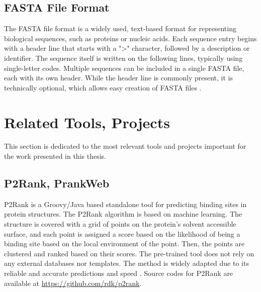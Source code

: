 \subsection{FASTA File Format}
\label{sec:fasta-format}

The FASTA file format is a widely used, text-based format for representing biological sequences, such as proteins or nucleic acids. Each sequence entry begins with a header line that starts with a ">" character, followed by a description or identifier. The sequence itself is written on the following lines, typically using single-letter codes. Multiple sequences can be included in a single FASTA file, each with its own header. While the header line is commonly present, it is technically optional, which allows easy creation of FASTA files \cite{lipman1985rapid}.

\begin{figure}[H]
    \centering
    
\end{figure}

\section{Related Tools, Projects}
\label{sec:related-tools}

This section is dedicated to the most relevant tools and projects important for the work presented in this thesis.

\subsection{P2Rank, PrankWeb}
\label{sec:prankweb-p2rank}

P2Rank is a Groovy/Java based standalone tool for predicting binding sites in protein structures. The P2Rank algorithm is based on machine learning. The structure is covered with a grid of points on the protein's solvent accessible surface, and each point is assigned a score based on the likelihood of being a binding site based on the local environment of the point. Then, the points are clustered and ranked based on their scores. The pre-trained tool does not rely on any external databases nor templates. The method is widely adapted due to its reliable and accurate predictions and speed \cite{krivak2018p2rank}. Source codes for P2Rank are available at \url{https://github.com/rdk/p2rank}.


